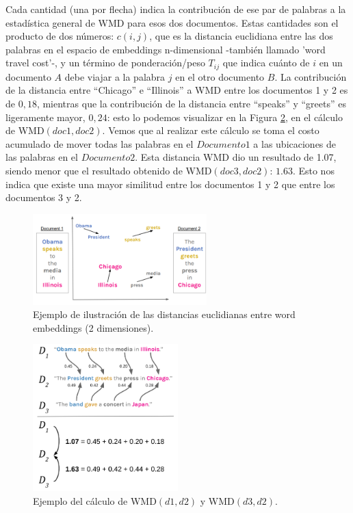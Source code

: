 \documentclass[12pt,a4paper]{article}
\begin{document}
\begin{sloppypar}
Cada cantidad (una por flecha) indica la contribución de ese par de palabras a la estadística general de WMD para esos dos documentos. Estas cantidades son el producto de dos números: $c(i,j)$, que es la distancia euclidiana entre las dos palabras en el espacio de embeddings n-dimensional -también llamado 'word travel cost'-, y un término de ponderación/peso $T_{ij}$ que indica cuánto de $i$ en un documento $A$ debe viajar a la palabra $j$ en el otro documento $B$. La contribución de la distancia entre “Chicago” e “Illinois” a WMD entre los documentos 1 y 2 es de $0,18$, mientras que la contribución de la distancia entre “speaks” y “greets” es ligeramente mayor, $0,24$: esto lo podemos visualizar en la Figura \ref{fig:Imagen_NLP_37}, en el cálculo de WMD$(doc1, doc2)$. Vemos que al realizar este cálculo se toma el costo acumulado de mover todas las palabras en el $Documento 1$ a las ubicaciones de las palabras en el $Documento 2$. Esta distancia WMD dio un resultado de 1.07, siendo menor que el resultado obtenido de WMD$(doc3, doc2)$: $1.63$. Esto nos indica que existe una mayor similitud entre los documentos 1 y 2 que entre los documentos 3 y 2. 

\begin{figure}[H]    
 \centering
 \includegraphics[width=0.6\textwidth]{images/NLP/36.png}
 \captionsetup{justification=centering,margin=2cm}
 \caption{Ejemplo de ilustración de las distancias euclidianas entre word embeddings (2 dimensiones)\cite{NLP_21}.}
 \label{fig:Imagen_NLP_36}
\end{figure}

\begin{figure}[H]    
 \centering
 \includegraphics[width=0.5\textwidth]{images/NLP/37.png}
 \captionsetup{justification=centering,margin=2cm}
 \caption{Ejemplo del cálculo de WMD$(d1,d2)$ y WMD$(d3,d2)$\cite{NLP_21}.}
 \label{fig:Imagen_NLP_37}
\end{figure}


\end{sloppypar}
\end{document}
